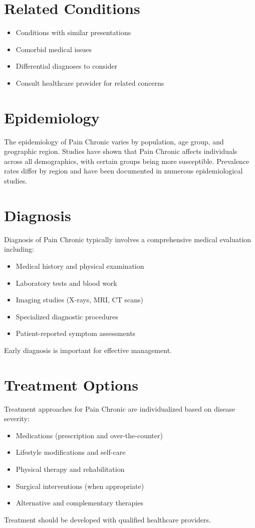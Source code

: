 \section*{Related Conditions}
\begin{itemize}
  \item Conditions with similar presentations
  \item Comorbid medical issues
  \item Differential diagnoses to consider
  \item Consult healthcare provider for related concerns
\end{itemize}

\section*{Epidemiology}
The epidemiology of Pain Chronic varies by population, age group, and geographic region. Studies have shown that Pain Chronic affects individuals across all demographics, with certain groups being more susceptible. Prevalence rates differ by region and have been documented in numerous epidemiological studies.

\section*{Diagnosis}
Diagnosis of Pain Chronic typically involves a comprehensive medical evaluation including:
\begin{itemize}
  \item Medical history and physical examination
  \item Laboratory tests and blood work
  \item Imaging studies (X-rays, MRI, CT scans)
  \item Specialized diagnostic procedures
  \item Patient-reported symptom assessments
\end{itemize}
Early diagnosis is important for effective management.

\section*{Treatment Options}
Treatment approaches for Pain Chronic are individualized based on disease severity:
\begin{itemize}
  \item Medications (prescription and over-the-counter)
  \item Lifestyle modifications and self-care
  \item Physical therapy and rehabilitation
  \item Surgical interventions (when appropriate)
  \item Alternative and complementary therapies
\end{itemize}
Treatment should be developed with qualified healthcare providers.

